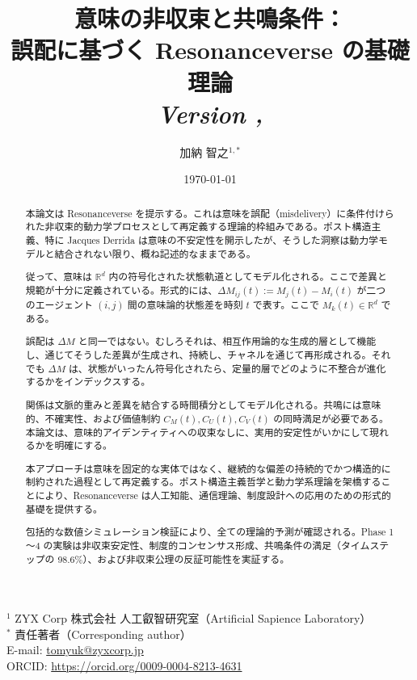 \documentclass[11pt,a4paper]{article}
\title{意味の非収束と共鳴条件：\\
誤配に基づく Resonanceverse の基礎理論\\
\large \textit{Version \versionnum, \versiondate}}
\author{加納 智之$^{1,*}$}
\date{\today}
\theoremstyle{definition}
\begin{document}
\maketitle

\begin{center}
\small
$^{1}$ ZYX Corp 株式会社 人工叡智研究室（Artificial Sapience Laboratory）\\
$^{*}$ 責任著者（Corresponding author）\\
E-mail: \url{tomyuk@zyxcorp.jp}\\
ORCID: \url{https://orcid.org/0009-0004-8213-4631}
\end{center}

\vspace{0.5cm}

\begin{abstract}
本論文は Resonanceverse を提示する。これは意味を誤配（misdelivery）に条件付けられた非収束的動力学プロセスとして再定義する理論的枠組みである。ポスト構造主義、特に Jacques Derrida は意味の不安定性を開示したが、そうした洞察は動力学モデルと結合されない限り、概ね記述的なままである。

従って、意味は $\mathbb{R}^d$ 内の符号化された状態軌道としてモデル化される。ここで差異と規範が十分に定義されている。形式的には、$\Delta M_{ij}(t) := M_j(t) - M_i(t)$ が二つのエージェント $(i, j)$ 間の意味論的状態差を時刻 $t$ で表す。ここで $M_k(t) \in \mathbb{R}^d$ である。

誤配は $\Delta M$ と同一ではない。むしろそれは、相互作用論的な生成的層として機能し、通じてそうした差異が生成され、持続し、チャネルを通じて再形成される。それでも $\Delta M$ は、状態がいったん符号化されたら、定量的層でどのように不整合が進化するかをインデックスする。

関係は文脈的重みと差異を結合する時間積分としてモデル化される。共鳴には意味的、不確実性、および価値制約 $C_M(t), C_U(t), C_V(t)$ の同時満足が必要である。本論文は、意味的アイデンティティへの収束なしに、実用的安定性がいかにして現れるかを明確にする。

本アプローチは意味を固定的な実体ではなく、継続的な偏差の持続的でかつ構造的に制約された過程として再定義する。ポスト構造主義哲学と動力学系理論を架橋することにより、Resonanceverse は人工知能、通信理論、制度設計への応用のための形式的基礎を提供する。

包括的な数値シミュレーション検証により、全ての理論的予測が確認される。Phase 1～4 の実験は非収束安定性、制度的コンセンサス形成、共鳴条件の満足（タイムステップの 98.6\%）、および非収束公理の反証可能性を実証する。
\end{abstract}
\end{document}
